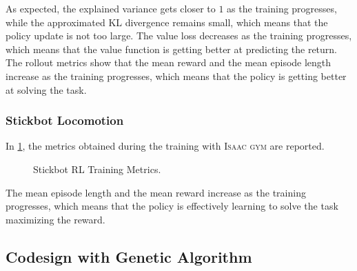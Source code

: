 As expected, the explained variance gets closer to $1$ as the training progresses, while the approximated KL divergence remains small, which means that the policy update is not too large. The value loss decreases as the training progresses, which means that the value function is getting better at predicting the return. The rollout metrics show that the mean reward and the mean episode length increase as the training progresses, which means that the policy is getting better at solving the task.

\subsubsection{Stickbot Locomotion}

In \cref{fig:stickbotresults}, the metrics obtained during the training with \textsc{Isaac gym} are reported.

\begin{figure}[h]
    \centering
    \caption{Stickbot RL Training Metrics.}
    \label{fig:stickbotresults}
\end{figure}

The mean episode length and the mean reward increase as the training progresses, which means that the policy is effectively learning to solve the task maximizing the reward.

\subsection{Codesign with Genetic Algorithm}

